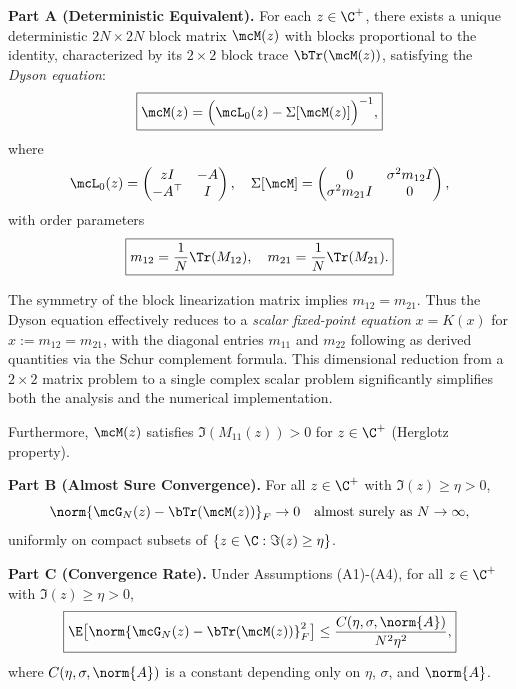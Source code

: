 \begin{theorem}
\medskip
\noindent\textbf{Part A (Deterministic Equivalent).} For each $z \in \C^+$, there exists a unique deterministic $2N \times 2N$ block matrix $\mcM(z)$ with blocks proportional to the identity, characterized by its $2 \times 2$ block trace $\bTr(\mcM(z))$, satisfying the \emph{Dyson equation}:
\begin{equation}\label{eq:dyson}
\boxed{\mcM(z) = \Bigl(\mcL_0(z) - \Sigma[\mcM(z)]\Bigr)^{-1},}
\end{equation}
where
\begin{equation}
\mcL_0(z) = \begin{pmatrix} zI & -A \\ -A^\top & I \end{pmatrix}, \quad
\Sigma[\mcM] = \begin{pmatrix} 0 & \sigma^2 m_{12} I \\ \sigma^2 m_{21} I & 0 \end{pmatrix},
\end{equation}
with order parameters
\begin{equation}\label{eq:order-params}
\boxed{m_{12} = \frac{1}{N}\Tr(M_{12}), \quad m_{21} = \frac{1}{N}\Tr(M_{21}).}
\end{equation}

\begin{remark}
The symmetry of the block linearization matrix implies $m_{12} = m_{21}$. Thus the Dyson equation effectively reduces to a \emph{scalar fixed-point equation} $x = K(x)$ for $x := m_{12} = m_{21}$, with the diagonal entries $m_{11}$ and $m_{22}$ following as derived quantities via the Schur complement formula. This dimensional reduction from a $2 \times 2$ matrix problem to a single complex scalar problem significantly simplifies both the analysis and the numerical implementation.
\end{remark}

Furthermore, $\mcM(z)$ satisfies $\Im(M_{11}(z)) > 0$ for $z \in \C^+$ (Herglotz property).

\medskip
\noindent\textbf{Part B (Almost Sure Convergence).} For all $z \in \C^+$ with $\Im(z) \geq \eta > 0$,
\begin{equation}
\norm{\mcG_N(z) - \bTr(\mcM(z))}_F \to 0 \quad \text{almost surely as } N \to \infty,
\end{equation}
uniformly on compact subsets of $\{z \in \C : \Im(z) \geq \eta\}$.

\medskip
\noindent\textbf{Part C (Convergence Rate).} Under Assumptions (A1)-(A4), for all $z \in \C^+$ with $\Im(z) \geq \eta > 0$,
\begin{equation}\label{eq:rate}
\boxed{\E\bigl[\norm{\mcG_N(z) - \bTr(\mcM(z))}^2_F\bigr] \leq \frac{C(\eta, \sigma, \norm{A})}{N^2 \eta^2},}
\end{equation}
where $C(\eta, \sigma, \norm{A})$ is a constant depending only on $\eta$, $\sigma$, and $\norm{A}$.


\end{theorem}
